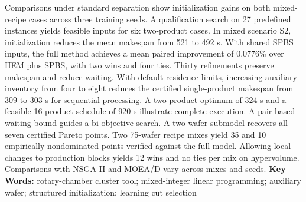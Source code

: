 Comparisons under standard separation show initialization gains on both mixed-recipe cases across three training seeds. A qualification search on 27 predefined instances yields feasible inputs for six two-product cases. In mixed scenario S2, initialization reduces the mean makespan from 521 to 492 s. With shared SPBS inputs, the full method achieves a mean paired improvement of 0.0776\% over HEM plus SPBS, with two wins and four ties. Thirty refinements preserve makespan and reduce waiting. With default residence limits, increasing auxiliary inventory from four to eight reduces the certified single-product makespan from 309 to 303 s for sequential processing. A two-product optimum of 324 s and a feasible 16-product schedule of 920 s illustrate complete execution. A pair-based waiting bound guides a bi-objective search. A two-wafer submodel recovers all seven certified Pareto points. Two 75-wafer recipe mixes yield 35 and 10 empirically nondominated points verified against the full model. Allowing local changes to production blocks yields 12 wins and no ties per mix on hypervolume. Comparisons with NSGA-II and MOEA/D vary across mixes and seeds.
\vfill
\noindent\textbf{Key Words: }rotary-chamber cluster tool; mixed-integer linear programming; auxiliary wafer; structured initialization; learning cut selection\clearpage
